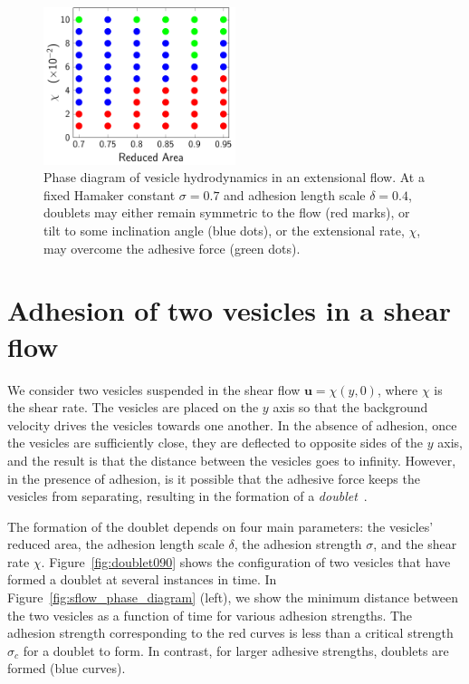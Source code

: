 \documentclass[aps,prl,twocolumn,showpacs,amsmath,amssymb]{revtex4-1}
\newcommand{\uu}{\mathbf{u}}
\begin{document}
\begin{figure}[htp]
  \includegraphics[width=0.5\textwidth]{figs/extensional_adR4em1adS7em1_phaseDiagram.pdf}
  \caption{\label{fig:extensionalPhaseDiagram} Phase diagram of vesicle
  hydrodynamics in an extensional flow.  At a fixed Hamaker constant
  $\sigma=0.7$ and adhesion length scale $\delta=0.4$, doublets may
  either remain symmetric to the flow (red marks), or tilt to some
  inclination angle (blue dots), or the extensional rate, $\chi$, may
  overcome the adhesive force (green dots).}
\end{figure}

\section{Adhesion of two vesicles in a shear flow}
\label{sec:sflow} 
We consider two vesicles suspended in the shear flow $\uu = \chi(y,0)$,
where $\chi$ is the shear rate.  The vesicles are placed on the $y$ axis
so that the background velocity drives the vesicles towards one another.
In the absence of adhesion, once the vesicles are sufficiently close,
they are deflected to opposite sides of the $y$ axis, and the result is
that the distance between the vesicles goes to infinity.  However, in
the presence of adhesion, is it possible that the adhesive force keeps
the vesicles from separating, resulting in the formation of a {\em
doublet}~\cite{}.

The formation of the doublet depends on four main parameters: the
vesicles' reduced area, the adhesion length scale $\delta$, the adhesion
strength $\sigma$, and the shear rate $\chi$.
Figure~\ref{fig:doublet090} shows the configuration of two vesicles that
have formed a doublet at several instances in time.  In
Figure~\ref{fig:sflow_phase_diagram} (left), we show the minimum
distance between the two vesicles as a function of time for various
adhesion strengths.  The adhesion strength corresponding to the red
curves is less than a critical strength $\sigma_c$ for a doublet to
form.  In contrast, for larger adhesive strengths, doublets are formed
(blue curves).
\end{document}

